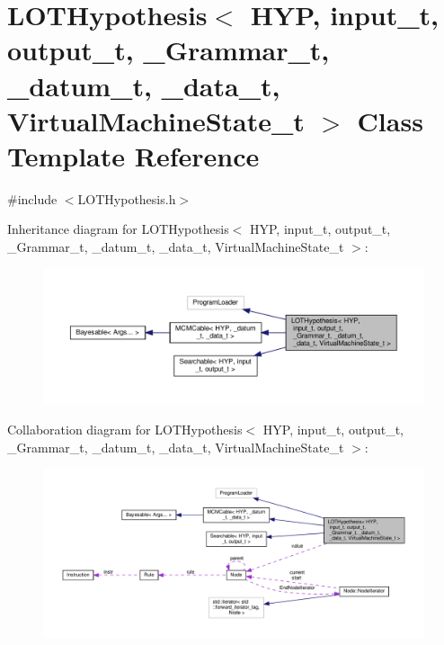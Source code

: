 \hypertarget{class_l_o_t_hypothesis}{}\section{L\+O\+T\+Hypothesis$<$ H\+YP, input\+\_\+t, output\+\_\+t, \+\_\+\+Grammar\+\_\+t, \+\_\+datum\+\_\+t, \+\_\+data\+\_\+t, Virtual\+Machine\+State\+\_\+t $>$ Class Template Reference}
\label{class_l_o_t_hypothesis}


{\ttfamily \#include $<$L\+O\+T\+Hypothesis.\+h$>$}



Inheritance diagram for L\+O\+T\+Hypothesis$<$ H\+YP, input\+\_\+t, output\+\_\+t, \+\_\+\+Grammar\+\_\+t, \+\_\+datum\+\_\+t, \+\_\+data\+\_\+t, Virtual\+Machine\+State\+\_\+t $>$\+:\nopagebreak
\begin{figure}[H]
\begin{center}
\leavevmode
\includegraphics[width=350pt]{class_l_o_t_hypothesis__inherit__graph}
\end{center}
\end{figure}


Collaboration diagram for L\+O\+T\+Hypothesis$<$ H\+YP, input\+\_\+t, output\+\_\+t, \+\_\+\+Grammar\+\_\+t, \+\_\+datum\+\_\+t, \+\_\+data\+\_\+t, Virtual\+Machine\+State\+\_\+t $>$\+:\nopagebreak
\begin{figure}[H]
\begin{center}
\leavevmode
\includegraphics[width=350pt]{class_l_o_t_hypothesis__coll__graph}
\end{center}
\end{figure}
